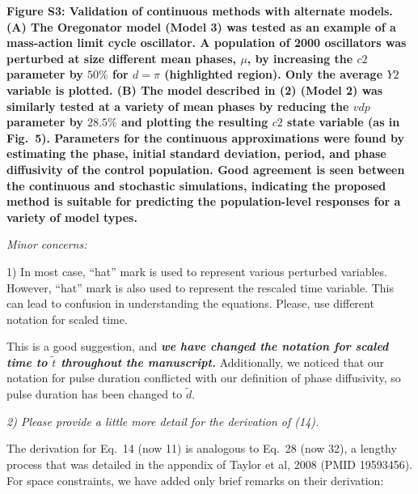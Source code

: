 \documentclass[11pt, letterpaper]{article}
\newenvironment{reviewer}{\itshape\color{gray}}{}
\newenvironment{manuscript}[1]{\begin{center}\begin{tcolorbox}[colback=green!5!white,colframe=green!75!black,width=0.8\textwidth,title={#1},breakable,fonttitle=\bfseries]}{\end{tcolorbox}\end{center}}
\begin{document}
\begin{manuscript}{Supplemental Info, Page 6}
\bfseries
Figure S3: Validation of continuous methods with alternate models.
(\bfseries A) The Oregonator model (Model 3) was tested as an example of a mass-action limit cycle oscillator.
A population of 2000 oscillators was perturbed at size different mean phases, $\mu$, by increasing the $\mathit{c2}$ parameter by $50\%$ for $d=\pi$ (highlighted region).
Only the average $\mathit{Y2}$ variable is plotted.
({\bfseries B}) The model described in (2) (Model 2) was similarly tested at a variety of mean phases by reducing the $\mathit{vdp}$ parameter by $28.5\%$ and plotting the resulting $\mathit{c2}$ state variable (as in Fig.~5).
Parameters for the continuous approximations were found by estimating the phase, initial standard deviation, period, and phase diffusivity of the control population.
Good agreement is seen between the continuous and stochastic simulations, indicating the proposed method is suitable for predicting the population-level responses for a variety of model types.
\end{manuscript}
 
\begin{reviewer}
Minor concerns: 

1) In most case, ``hat'' mark is used to represent various perturbed variables.
However, ``hat'' mark is also used to represent the rescaled time variable.
This can lead to confusion in understanding the equations.
Please, use different notation for scaled time.
\end{reviewer}

This is a good suggestion, and {\itshape\bfseries we have changed the notation for scaled time to $\tilde{t}$ throughout the manuscript.}
Additionally, we noticed that our notation for pulse duration conflicted with our definition of phase diffusivity, so pulse duration has been changed to $\tilde{d}$.

\begin{reviewer}
2) Please provide a little more detail for the derivation of (14).
\end{reviewer}

The derivation for Eq.~14 (now 11) is analogous to Eq.~28 (now 32), a lengthy process that was detailed in the appendix of Taylor et al, 2008 (PMID 19593456).
For space constraints, we have added only brief remarks on their derivation:
\end{document}
